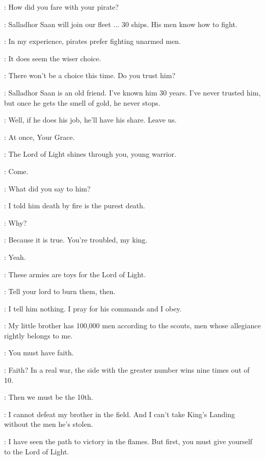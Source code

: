 \STANNIS: How did you fare with your pirate?

\DAVOS: Salladhor Saan will join our fleet $\ldots$ 30 ships. His men know how to fight.

\STANNIS: In my experience, pirates prefer fighting unarmed men.

\DAVOS: It does seem the wiser choice.

\STANNIS: There won't be a choice this time. Do you trust him?

\DAVOS: Salladhor Saan is an old friend. I've known him 30 years. I've never trusted him, but once he gets the smell of gold, he never stops.

\STANNIS: Well, if he does his job, he'll have his share. Leave us.

\DAVOS: At once, Your Grace.


\MELISANDRE: The Lord of Light shines through you, young warrior.


\DAVOS: Come.

\STANNIS: What did you say to him?

\MELISANDRE: I told him death by fire is the purest death.

\STANNIS: Why?

\MELISANDRE: Because it is true. You're troubled, my king.

\STANNIS: Yeah.

\MELISANDRE: These armies are toys for the Lord of Light.

\STANNIS: Tell your lord to burn them, then.

\MELISANDRE: I tell him nothing. I pray for his commands and I obey.

\STANNIS: My little brother has 100,000 men according to the scouts, men whose allegiance rightly belongs to me.

\MELISANDRE: You must have faith.

\STANNIS: Faith? In a real war, the side with the greater number wins nine times out of 10.

\MELISANDRE: Then we must be the 10th.

\STANNIS: I cannot defeat my brother in the field. And I can't take King's Landing without the men he's stolen.

\MELISANDRE: I have seen the path to victory in the flames. But first, you must give yourself to the Lord of Light.

